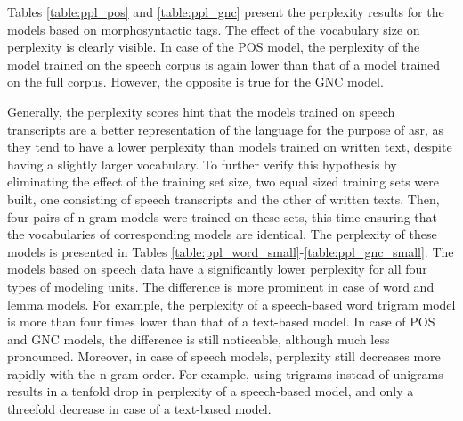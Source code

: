 Tables \ref{table:ppl_pos} and \ref{table:ppl_gnc} present the perplexity results for the models based on morphosyntactic tags. The effect of the vocabulary size on perplexity is clearly visible. In case of the POS model, the perplexity of the model trained on the speech corpus is again lower than that of a model trained on the full corpus. However, the opposite is true for the GNC model. 

Generally, the perplexity scores hint that the models trained on speech transcripts are a better representation of the language for the purpose of \gls{asr}, as they tend to have a lower perplexity than models trained on written text, despite having a slightly larger vocabulary. To further verify this hypothesis by eliminating the effect of the training set size, two equal sized training sets were built, one consisting of speech transcripts and the other of written texts. Then, four pairs of \mbox{n-gram} models were trained on these sets, this time ensuring that the vocabularies of corresponding models are identical. The perplexity of these models is presented in Tables \mbox{\ref{table:ppl_word_small}-\ref{table:ppl_gnc_small}}. The models based on speech data have a significantly lower perplexity for all four types of modeling units. The difference is more prominent in case of word and lemma models. For example, the perplexity of a \mbox{speech-based} word trigram model is more than four times lower than that of a \mbox{text-based} model. In case of POS and GNC models, the difference is still noticeable, although much less pronounced. Moreover, in case of speech models, perplexity still decreases more rapidly with the n-gram order. For example, using trigrams instead of unigrams results in a tenfold drop in perplexity of a \mbox{speech-based} model, and only a threefold decrease in case of a \mbox{text-based} model. 

